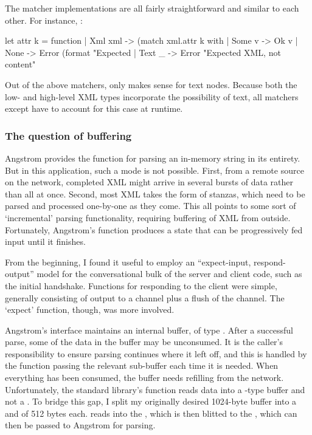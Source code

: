 \documentclass[12pt,a4paper,twoside,openright]{report}
\begin{document}
{The matcher implementations are all fairly straightforward and similar to each other. For instance, :

\begin{ocaml}
let attr k = function
  | Xml xml -> (match xml.attr k with
    | Some v -> Ok v
    | None -> Error (format "Expected %
  | Text _ -> Error "Expected XML, not content"
\end{ocaml}

Out of the above matchers, only  makes sense for text nodes. Because both the low- and high-level XML types incorporate the possibility of text, all matchers except  have to account for this case at runtime.

\subsubsection{The question of buffering}
Angstrom provides the  function for parsing an in-memory string in its entirety. But in this application, such a mode is not possible. First, from a remote source on the network, completed XML might arrive in several bursts of data rather than all at once. Second, most XML takes the form of stanzas, which need to be parsed and processed one-by-one as they come. This all points to some sort of `incremental' parsing functionality, requiring buffering of XML from outside. Fortunately, Angstrom's  function produces a state that can be progressively fed input until it finishes.

From the beginning, I found it useful to employ an ``expect-input, respond-output'' model for the conversational bulk of the server and client code, such as the initial handshake. Functions for responding to the client were simple, generally consisting of output to a channel plus a flush of the channel. The `expect' function, though, was more involved.

Angstrom's  interface maintains an internal buffer, of type . After a successful parse, some of the data in the buffer may be unconsumed. It is the caller's responsibility to ensure parsing continues where it left off, and this is handled by the function passing the relevant sub-buffer each time it is needed. When everything has been consumed, the buffer needs refilling from the network. Unfortunately, the standard library's  function reads data into a -type buffer and not a . To bridge this gap, I split my originally desired 1024-byte buffer into a  and  of 512 bytes each.  reads into the , which is then blitted to the , which can then be passed to Angstrom for parsing.

}
\end{document}
